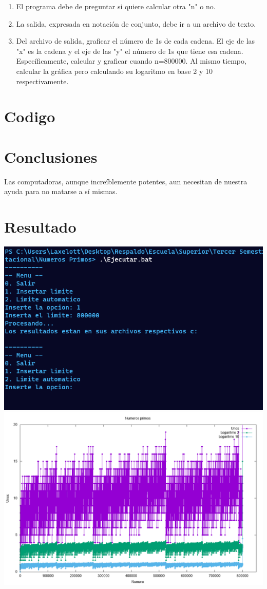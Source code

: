 \documentclass{article}
\begin{document}
\begin{enumerate}
	\item El programa debe de preguntar si quiere calcular otra "n" o no.
	\item La salida, expresada en notación de conjunto, debe ir a un archivo de texto.
	\item Del archivo de salida, graficar el número de 1s de cada cadena. El eje de las "x" es la cadena y el eje de las "y" el número de 1s que tiene esa cadena. Específicamente, calcular y graficar cuando n=800000. Al mismo tiempo, calcular la gráfica pero calculando su logaritmo en base 2 y 10 respectivamente.
\end{enumerate}
	
	\section{Codigo}
	
	\section{Conclusiones}
	Las computadoras, aunque increíblemente potentes, aun necesitan de nuestra ayuda para no matarse a sí mismas.
	\section{Resultado}
		\centering
		\includegraphics[width=\textwidth]{ejecucion}
		\includegraphics[width=\textwidth]{grafica}
		
\end{document}
